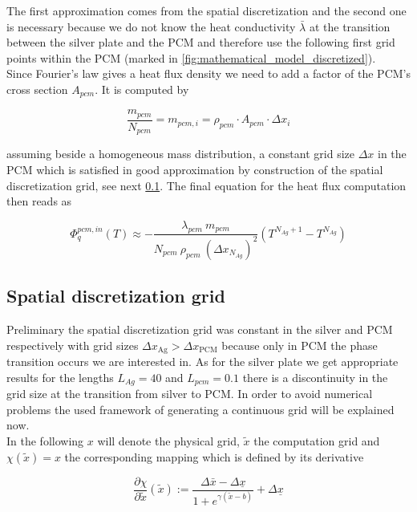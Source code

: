 \documentclass{scrartcl}[12pt, halfparskip]
\numberwithin{equation}{section}
\numberwithin{figure}{section}
\numberwithin{table}{section}
\begin{document}
The first approximation comes from the spatial discretization and the second one is necessary because we do not know the heat conductivity $\bar{\lambda}$ at the transition between the silver plate and the PCM and therefore use the following first grid points within the PCM (marked in \cref{fig:mathematical_model_discretized}). \\
Since Fourier's law gives a heat flux density we need to add a factor of the PCM's cross section $A_{pcm}$. It is computed by

\begin{equation}
	\frac{m_{pcm}}{N_{pcm}} = m_{pcm,i} = \rho_{pcm} \cdot A_{pcm} \cdot \Delta x_i 
\end{equation}



assuming beside a homogeneous mass distribution, a constant grid size $\Delta x$ in the PCM which is satisfied in good approximation by construction of the spatial discretization grid, see next \cref{sec:spatial_discretization_grid}. The final equation for the heat flux computation then reads as

\begin{equation}
	\varPhi_{q}^{pcm,in}(T) \approx - \frac{\lambda_{pcm} \ m_{pcm}}{N_{pcm} \ \rho_{pcm} \ (\Delta x_{N_{Ag}})^2} \left( T^{N_{Ag}+1} - T^{N_{Ag}} \right)
	\label{eq:heat_flux_computation_final}
\end{equation}



\subsection{Spatial discretization grid}
\label{sec:spatial_discretization_grid}
Preliminary the spatial discretization grid was constant in the silver and PCM respectively with grid sizes $\Delta x_{\text{Ag}} > \Delta x_{\text{PCM}}$ because only in PCM the phase transition occurs we are interested in. As for the silver plate we get appropriate results for the lengths $L_{Ag}=40$ and $L_{pcm}=0.1$ there is a discontinuity in the grid size at the transition from silver to PCM. In order to avoid numerical problems the used framework of generating a continuous grid will be explained now. \\
In the following $x$ will denote the physical grid, $\tilde{x}$ the computation grid and $\chi(\tilde{x}) = x$ the corresponding mapping which is defined by its derivative

\begin{equation}
	\frac{\partial \chi}{\partial \tilde{x}}(\tilde{x}) := \frac{\Delta \bar{x} - \Delta \underline{x}}{1 + e^{\gamma(\tilde{x} - b)}} + \Delta \underline{x}
\end{equation}
\end{document}

